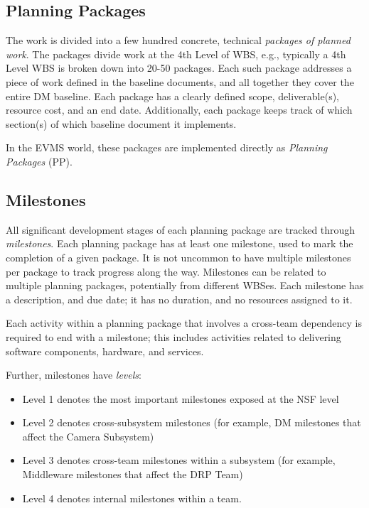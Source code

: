 \documentclass[DM,toc,obsolete]{lsstdoc}
\newcommand{\sphinxstyleemphasis}{\emph}
\begin{document}
\subsection{Planning Packages}
\label{\detokenize{index:planning-packages}}
The work is divided into a few hundred concrete, technical \sphinxstyleemphasis{packages of planned work}. The packages divide work
at the 4th Level of WBS, e.g., typically a 4th Level WBS is broken down into 20-50 packages. Each such package
addresses a piece of work defined in the baseline documents, and all together they cover the entire DM baseline.
Each package has a clearly defined scope, deliverable(s), resource cost, and an end date. Additionally,
each package keeps track of which section(s) of which baseline document it implements.

In the EVMS world, these packages are implemented directly as \sphinxstyleemphasis{Planning Packages} (PP).


\subsection{Milestones}
\label{\detokenize{index:milestones}}
All significant development stages of each planning package are tracked through \sphinxstyleemphasis{milestones}.
Each planning package has at least one milestone, used to mark the completion of a given package.
It is not uncommon to have multiple milestones per package to track progress along the way.
Milestones can be related to multiple planning packages, potentially from different WBSes.
Each milestone has a description, and due date; it has no duration, and no resources assigned to it.

Each activity within a planning package that involves a cross-team dependency is required to end with
a milestone; this includes activities related to delivering software components, hardware, and services.

Further, milestones have \sphinxstyleemphasis{levels}:
\begin{itemize}
\item {}
Level 1 denotes the most important milestones exposed at the NSF level

\item {}
Level 2 denotes cross-subsystem milestones (for example, DM milestones that affect the Camera Subsystem)

\item {}
Level 3 denotes cross-team milestones within a subsystem (for example, Middleware milestones that affect the DRP Team)

\item {}
Level 4 denotes internal milestones within a team.

\end{itemize}
\end{document}
